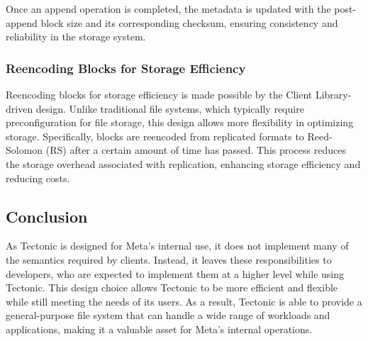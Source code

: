 Once an append operation is completed, the metadata is updated with the post-append block size and its corresponding checksum, ensuring consistency and reliability in the storage system.

\subsubsection*{Reencoding Blocks for Storage Efficiency}\label{sec:reencoding_blocks}

Reencoding blocks for storage efficiency is made possible by the Client Library-driven design. Unlike traditional file systems, which typically require preconfiguration for file storage, this design allows more flexibility in optimizing storage. Specifically, blocks are reencoded from replicated formats to Reed-Solomon (RS) after a certain amount of time has passed. This process reduces the storage overhead associated with replication, enhancing storage efficiency and reducing costs.

\subsection{Conclusion}\label{sec:tectonic_conclusion}
As Tectonic is designed for Meta's internal use, it does not implement many of the semantics required by clients. Instead, it leaves these responsibilities to developers, who are expected to implement them at a higher level while using Tectonic. This design choice allows Tectonic to be more efficient and flexible while still meeting the needs of its users. As a result, Tectonic is able to provide a general-purpose file system that can handle a wide range of workloads and applications, making it a valuable asset for Meta's internal operations.